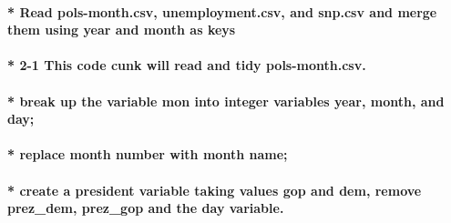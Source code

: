 \documentclass[]{article}
\let\oldparagraph\paragraph
\renewcommand{\paragraph}[1]{\oldparagraph{#1}\mbox{}}
\begin{document}
\hypertarget{read-pols-month.csv-unemployment.csv-and-snp.csv-and-merge-them-using-year-and-month-as-keys}{%
\paragraph{* Read pols-month.csv, unemployment.csv, and snp.csv and
merge them using year and month as
keys}\label{read-pols-month.csv-unemployment.csv-and-snp.csv-and-merge-them-using-year-and-month-as-keys}}

\hypertarget{this-code-cunk-will-read-and-tidy-pols-month.csv.}{%
\paragraph{* 2-1 This code cunk will read and tidy
pols-month.csv.}\label{this-code-cunk-will-read-and-tidy-pols-month.csv.}}

\hypertarget{break-up-the-variable-mon-into-integer-variables-year-month-and-day}{%
\paragraph{* break up the variable mon into integer variables year,
month, and
day;}\label{break-up-the-variable-mon-into-integer-variables-year-month-and-day}}

\hypertarget{replace-month-number-with-month-name}{%
\paragraph{* replace month number with month
name;}\label{replace-month-number-with-month-name}}

\hypertarget{create-a-president-variable-taking-values-gop-and-dem-remove-prez_dem-prez_gop-and-the-day-variable.}{%
\paragraph{* create a president variable taking values gop and dem,
remove prez\_dem, prez\_gop and the day
variable.}\label{create-a-president-variable-taking-values-gop-and-dem-remove-prez_dem-prez_gop-and-the-day-variable.}}
\end{document}
